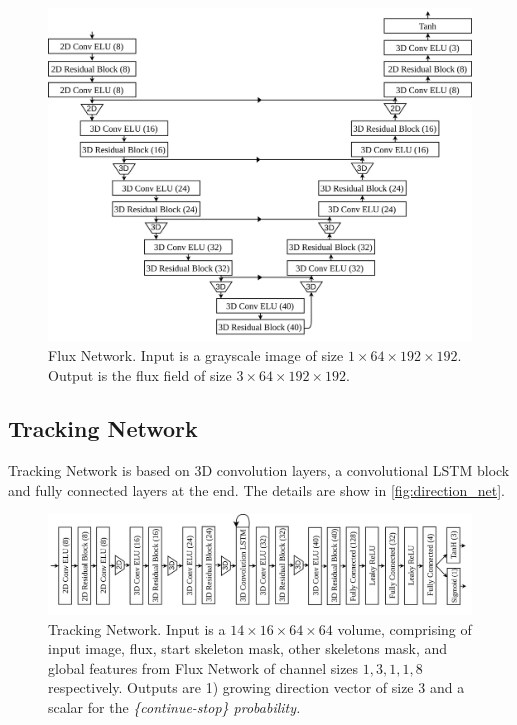 \begin{figure}[ht]
	\centering
	\includegraphics[width=\textwidth]{figures/network/flux_net.png}
	\caption{Flux Network. Input is a grayscale image of size $1\times64\times192\times192$. Output is the flux field of size $3\times64\times192\times192$.}
	\label{fig:flux_net}
\end{figure}


\subsection{Tracking Network}

Tracking Network is based on 3D convolution layers, a convolutional LSTM block and fully connected layers at the end. The details are show in \autoref{fig:direction_net}.

\begin{figure}[ht]
	\captionsetup[subfigure]{aboveskip=1pt,belowskip=1pt}
	\centering
	\includegraphics[width=\textwidth]{figures/network/direction_net.png}
	\caption{Tracking Network. Input is a $14\times16\times64\times64$ volume, comprising of input image, flux, start skeleton mask, other skeletons mask, and global features from Flux Network of channel sizes $1, 3, 1, 1, 8$ respectively. Outputs are 1) growing direction vector of size 3 and a scalar for the \it{\{continue-stop\}} probability.}
	\label{fig:direction_net}
	\vspace{-0.1in}
\end{figure}
